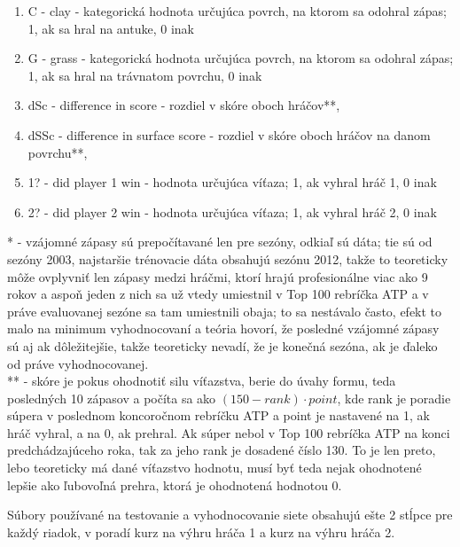 \begin{enumerate}
 \item C  - clay - kategorická hodnota určujúca povrch, na ktorom sa odohral zápas; 1, ak sa hral na antuke, 0 inak
 \item G - grass - kategorická hodnota určujúca povrch, na ktorom sa odohral zápas; 1, ak sa hral na trávnatom povrchu, 0 inak
 \item dSc - difference in score - rozdiel v skóre oboch hráčov**,
 \item dSSc - difference in surface score - rozdiel v skóre oboch hráčov na danom povrchu**,
 \item 1? - did player 1 win - hodnota určujúca víťaza; 1, ak vyhral hráč 1, 0 inak
 \item 2? - did player 2 win - hodnota určujúca víťaza; 1, ak vyhral hráč 2, 0 inak
\end{enumerate}
* - vzájomné zápasy sú prepočítavané len pre sezóny, odkiaľ sú dáta; tie sú od sezóny 2003, najstaršie trénovacie dáta obsahujú sezónu 2012, takže to teoreticky môže ovplyvniť len zápasy medzi hráčmi, ktorí hrajú profesionálne viac ako 9 rokov a aspoň jeden z nich sa už vtedy umiestnil v Top 100 rebríčka ATP a v práve evaluovanej sezóne sa tam umiestnili obaja; to sa nestávalo často, efekt to malo na minimum vyhodnocovaní a teória hovorí, že posledné vzájomné zápasy sú aj ak dôležitejšie, takže teoreticky nevadí, že je konečná sezóna, ak je ďaleko od práve vyhodnocovanej.\\
** - skóre je pokus ohodnotiť silu víťazstva, berie do úvahy formu, teda posledných 10 zápasov a počíta sa ako $(150 - rank)\cdot point$, kde rank je poradie súpera v poslednom koncoročnom rebríčku ATP a point je nastavené na 1, ak hráč vyhral, a na 0, ak prehral. 
Ak súper nebol v Top 100 rebríčka ATP na konci predchádzajúceho roka, tak za jeho rank je dosadené číslo 130.
To je len preto, lebo teoreticky má dané víťazstvo hodnotu, musí byť teda nejak ohodnotené lepšie ako ľubovoľná prehra, ktorá je ohodnotená hodnotou 0.

Súbory používané na testovanie a vyhodnocovanie siete obsahujú ešte 2 stĺpce pre každý riadok, v poradí kurz na výhru hráča 1 a kurz na výhru hráča 2.